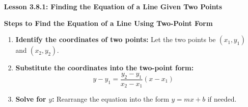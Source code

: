  \begin{center}
\textbf{Lesson 3.8.1: Finding the Equation of a Line Given Two Points}
\end{center}

\vspace*{1ex}

\noindent\textbf{Steps to Find the Equation of a Line Using Two-Point Form}

\begin{enumerate}
    \item \textbf{Identify the coordinates of two points:} Let the two points be $(x_1, y_1)$ and $(x_2, y_2)$.
    \item \textbf{Substitute the coordinates into the two-point form:}
    \[
 y - y_1 = \dfrac{y_2 - y_1}{x_2 - x_1}(x - x_1)     \]
    \item \textbf{Solve for $y$:} Rearrange the equation into the form $y = mx + b$ if needed.
\end{enumerate}

